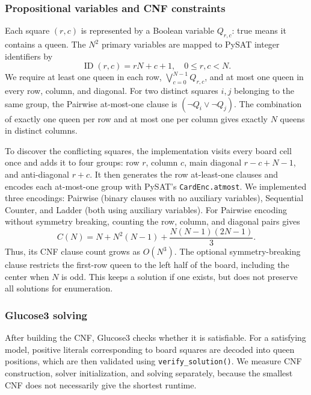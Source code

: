 \documentclass[conference]{IEEEtran}
\begin{document}
\subsubsection{Propositional variables and CNF constraints}
Each square \((r,c)\) is represented by a Boolean variable \(Q_{r,c}\): true means it contains a queen. The \(N^2\) primary variables are mapped to PySAT integer identifiers by
\begin{equation}
    \operatorname{ID}(r,c)=rN+c+1,\quad 0\leq r,c<N.
    \label{eq:queenvar}
\end{equation}
We require at least one queen in each row,
\(\bigvee_{c=0}^{N-1}Q_{r,c}\), and at most one queen in every row, column, and diagonal. For two distinct squares \(i,j\) belonging to the same group, the Pairwise at-most-one clause is \((\neg Q_i\lor\neg Q_j)\). The combination of exactly one queen per row and at most one per column gives exactly \(N\) queens in distinct columns.

To discover the conflicting squares, the implementation visits every board cell once and adds it to four groups: row \(r\), column \(c\), main diagonal \(r-c+N-1\), and anti-diagonal \(r+c\). It then generates the row at-least-one clauses and encodes each at-most-one group with PySAT's \texttt{CardEnc.atmost}. We implemented three encodings: Pairwise (binary clauses with no auxiliary variables), Sequential Counter, and Ladder (both using auxiliary variables). For Pairwise encoding without symmetry breaking, counting the row, column, and diagonal pairs gives
\begin{equation}
    C(N)=N+N^2(N-1)+\frac{N(N-1)(2N-1)}{3}.
    \label{eq:queencount}
\end{equation}
Thus, its CNF clause count grows as \(O(N^3)\). The optional symmetry-breaking clause restricts the first-row queen to the left half of the board, including the center when \(N\) is odd. This keeps a solution if one exists, but does not preserve all solutions for enumeration.

\subsubsection{Glucose3 solving}
After building the CNF, Glucose3 checks whether it is satisfiable. For a satisfying model, positive literals corresponding to board squares are decoded into queen positions, which are then validated using \texttt{verify\_solution()}. We measure CNF construction, solver initialization, and solving separately, because the smallest CNF does not necessarily give the shortest runtime.
\end{document}
